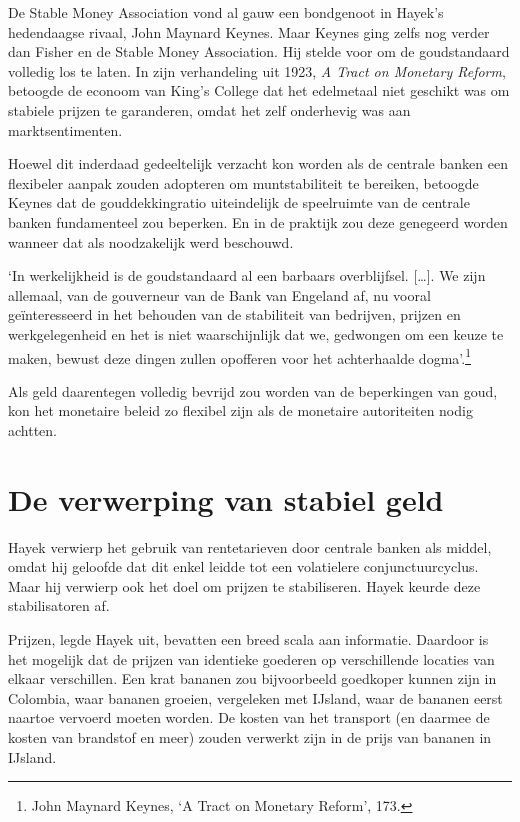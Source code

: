 \documentclass[smalldemyvopaper,11pt,twoside,onecolumn,openright,extrafontsizes,hidelinks]{memoir}
\begin{document}
De Stable Money Association vond al gauw een bondgenoot in Hayek's
hedendaagse rivaal, John Maynard Keynes. Maar Keynes ging zelfs nog
verder dan Fisher en de Stable Money Association. Hij stelde voor om de
goudstandaard volledig los te laten. In zijn verhandeling uit 1923,
\emph{A Tract on Monetary Reform}, betoogde de econoom van King's
College dat het edelmetaal niet geschikt was om stabiele prijzen te
garanderen, omdat het zelf onderhevig was aan marktsentimenten.

Hoewel dit inderdaad gedeeltelijk verzacht kon worden als de centrale
banken een flexibeler aanpak zouden adopteren om muntstabiliteit te
bereiken, betoogde Keynes dat de gouddekkingratio uiteindelijk de
speelruimte van de centrale banken fundamenteel zou beperken. En in de
praktijk zou deze genegeerd worden wanneer dat als noodzakelijk werd
beschouwd.

`In werkelijkheid is de goudstandaard al een barbaars overblijfsel.
{[}\ldots{]}. We zijn allemaal, van de gouverneur van de Bank van
Engeland af, nu vooral geïnteresseerd in het behouden van de stabiliteit
van bedrijven, prijzen en werkgelegenheid en het is niet waarschijnlijk
dat we, gedwongen om een keuze te maken, bewust deze dingen zullen
opofferen voor het achterhaalde dogma'.\footnote{\hspace{0pt}John
  Maynard Keynes, `A Tract on Monetary Reform', 173.}

Als geld daarentegen volledig bevrijd zou worden van de beperkingen van
goud, kon het monetaire beleid zo flexibel zijn als de monetaire
autoriteiten nodig achtten.

\section{De verwerping van stabiel
geld}\label{de-verwerping-van-stabiel-geld}

Hayek verwierp het gebruik van rentetarieven door centrale banken als
middel, omdat hij geloofde dat dit enkel leidde tot een volatielere
conjunctuurcyclus. Maar hij verwierp ook het doel om prijzen te
stabiliseren. Hayek keurde deze stabilisatoren af.

Prijzen, legde Hayek uit, bevatten een breed scala aan informatie.
Daardoor is het mogelijk dat de prijzen van identieke goederen op
verschillende locaties van elkaar verschillen. Een krat bananen zou
bijvoorbeeld goedkoper kunnen zijn in Colombia, waar bananen groeien,
vergeleken met IJsland, waar de bananen eerst naartoe vervoerd moeten
worden. De kosten van het transport (en daarmee de kosten van brandstof
en meer) zouden verwerkt zijn in de prijs van bananen in IJsland.
\end{document}
